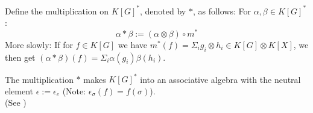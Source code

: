 \begin{definition}
  Define the multiplication on $ K \left\lbrack G \right\rbrack^\ast $, denoted by $\ast$, as follows:  For $\alpha, \beta \in K \left\lbrack G \right\rbrack^\ast$:  
  \begin{equation}
    \alpha \ast \beta := \left( \alpha \otimes \beta \right) \circ m^\ast
  \end{equation}
  More slowly: If for $f \in K \left\lbrack G \right\rbrack$ we have $m^\ast \left( f \right) = \Sigma_i g_i \otimes h_i \in K[G] \otimes K[X]$, we then get $\left( \alpha \ast \beta \right) \left( f \right) = \Sigma_i \alpha \left( g_i \right) \beta \left( h_i \right)$.
\end{definition}
%
%

\begin{proposition}
  The multiplication $\ast$ makes $K \left\lbrack G \right\rbrack^\ast$ into an associative algebra with the neutral element $ \epsilon := \epsilon_e$ (Note: $\epsilon_\sigma \left( f \right) = f \left( \sigma \right)$).\\
  (See \cite[A2.2]{DK15})
\end{proposition}

